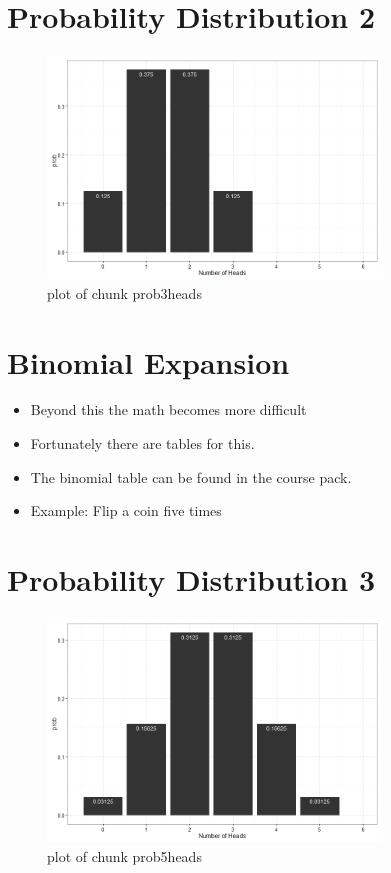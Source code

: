 \documentclass[12pt]{article}
\begin{document}
\section{Probability Distribution 2}\label{probability-distribution-2}

\begin{figure}[H]
\centering
\includegraphics[width=3.5in]{figure/prob3heads-1.png}
\caption{plot of chunk prob3heads}
\end{figure}

\section{Binomial Expansion}\label{binomial-expansion}

\begin{itemize}
\itemsep1pt\parskip0pt
\item
  Beyond this the math becomes more difficult
\item
  Fortunately there are tables for this.
\item
  The binomial table can be found in the course pack.
\item
  Example: Flip a coin five times
\end{itemize}

\section{Probability Distribution 3}\label{probability-distribution-3}

\begin{figure}[H]
\centering
\includegraphics[width=3.5in]{figure/prob5heads-1.png}
\caption{plot of chunk prob5heads}
\end{figure}
\end{document}
